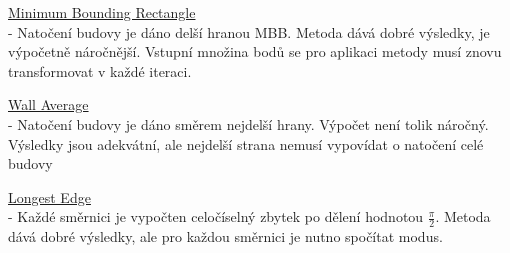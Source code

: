 \documentclass[oneside,12pt,a4paper]{book}
\begin{document}
\underline{Minimum Bounding Rectangle}\\
- Natočení budovy je dáno delší hranou MBB. Metoda dává dobré výsledky, je výpočetně náročnější. Vstupní množina bodů se pro aplikaci metody musí znovu transformovat v každé iteraci. \par

\underline{Wall Average}\\
- Natočení budovy je dáno směrem nejdelší hrany. Výpočet není tolik náročný. Výsledky jsou adekvátní, ale nejdelší strana nemusí vypovídat o natočení celé budovy 

 
 \underline{Longest Edge}\\
- Každé směrnici je vypočten celočíselný zbytek po dělení hodnotou $\frac{\pi}{2}$. Metoda dává dobré výsledky, ale pro každou směrnici je nutno spočítat modus.

\begingroup
    \pageclear
    \printbibliography[title=Literatura]
\endgroup

\end{document}
